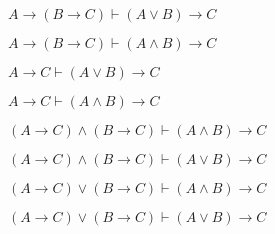 \documentclass[
  ignorenonframetext,
]{beamer}
\renewcommand{\,}{\text{, }}
\begin{document}
\begin{frame}{\(A \rightarrow (B \rightarrow C) \vdash (A \vee B) \rightarrow C\)}
\protect\hypertarget{a-rightarrow-b-rightarrow-c-vdash-a-vee-b-rightarrow-c}{}

\end{frame}

\begin{frame}{\(A \rightarrow (B \rightarrow C) \vdash (A \wedge B) \rightarrow C\)}
\protect\hypertarget{a-rightarrow-b-rightarrow-c-vdash-a-wedge-b-rightarrow-c}{}

\end{frame}

\begin{frame}{\(A \rightarrow C \vdash (A \vee B) \rightarrow C\)}
\protect\hypertarget{a-rightarrow-c-vdash-a-vee-b-rightarrow-c}{}

\end{frame}

\begin{frame}{\(A \rightarrow C \vdash (A \wedge B) \rightarrow C\)}
\protect\hypertarget{a-rightarrow-c-vdash-a-wedge-b-rightarrow-c}{}

\end{frame}

\begin{frame}{\((A \rightarrow C) \wedge (B \rightarrow C) \vdash (A \wedge B) \rightarrow C\)}
\protect\hypertarget{a-rightarrow-c-wedge-b-rightarrow-c-vdash-a-wedge-b-rightarrow-c}{}

\end{frame}

\begin{frame}{\((A \rightarrow C) \wedge (B \rightarrow C) \vdash (A \vee B) \rightarrow C\)}
\protect\hypertarget{a-rightarrow-c-wedge-b-rightarrow-c-vdash-a-vee-b-rightarrow-c}{}

\end{frame}

\begin{frame}{\((A \rightarrow C) \vee (B \rightarrow C) \vdash (A \wedge B) \rightarrow C\)}
\protect\hypertarget{a-rightarrow-c-vee-b-rightarrow-c-vdash-a-wedge-b-rightarrow-c}{}

\end{frame}

\begin{frame}{\((A \rightarrow C) \vee (B \rightarrow C) \vdash (A \vee B) \rightarrow C\)}
\protect\hypertarget{a-rightarrow-c-vee-b-rightarrow-c-vdash-a-vee-b-rightarrow-c}{}

\end{frame}
\end{document}

